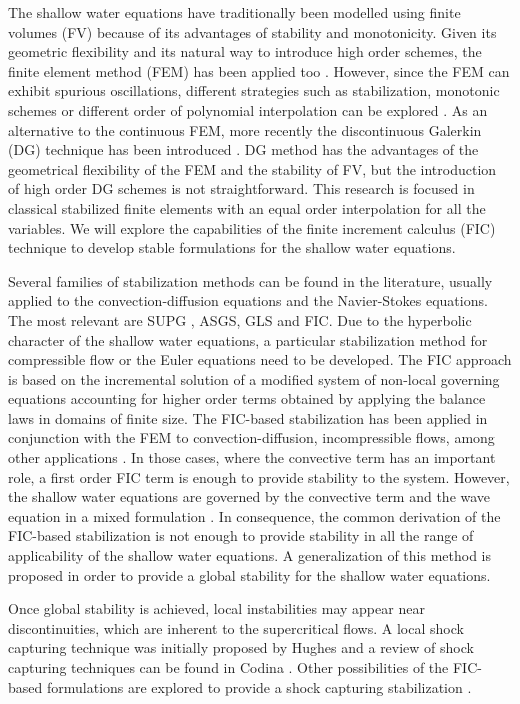 \documentclass[a4paper,12pt]{elsarticle}
\begin{document}
The shallow water equations have traditionally been modelled using finite volumes (FV) because of its advantages of stability and monotonicity. Given its geometric flexibility and its natural way to introduce high order schemes, the finite element method (FEM) has been applied too \cite{zien3,navon1979,navon1988}.
However, since the FEM can exhibit spurious oscillations, different strategies such as stabilization, monotonic schemes or different order of polynomial interpolation can be explored \cite{hood1974,zien3,ortiz2012}.
As an alternative to the continuous FEM, more recently the discontinuous Galerkin (DG) technique has been introduced \cite{ambati2007,khan2014,lee2019}.
DG method has the advantages of the geometrical flexibility of the FEM and the stability of FV, but the introduction of high order DG schemes is not straightforward.
This research is focused in classical stabilized finite elements with an equal order interpolation for all the variables. We will explore the capabilities of the finite increment calculus (FIC) technique to develop stable formulations for the shallow water equations.

Several families of stabilization methods can be found in the literature, usually applied to the convection-diffusion equations and the Navier-Stokes equations. The most relevant are SUPG \cite{brooks1982},
ASGS\cite{codina1998}, GLS \cite{hughes1989} and FIC\cite{onate1996,onate1998}.
Due to the hyperbolic character of the shallow water equations, a particular stabilization method for compressible flow or the Euler equations need to be developed.
The FIC approach is based on the incremental solution of a modified system of non-local governing equations accounting for higher order terms obtained by applying the balance laws in domains of finite size.
The FIC-based stabilization has been applied in conjunction with the FEM to convection-diffusion, incompressible flows, among other applications \cite{onate1998,onate2001}.
In those cases, where the convective term has an important role, a first order FIC term is enough to provide stability to the system.
However, the shallow water equations are governed by the convective term and the wave equation in a mixed formulation \cite{codina2008}. In consequence, the common derivation of the FIC-based stabilization is not enough to provide stability in all the range of applicability of the shallow water equations. 
A generalization of this method is proposed in order to provide a global stability for the shallow water equations.

Once global stability is achieved, local instabilities may appear near discontinuities, which are inherent to the supercritical flows.
A local shock capturing technique was initially proposed by Hughes \cite{hughes1986} and a review of shock capturing techniques can be found in Codina \cite{codina2011}.
Other possibilities of the FIC-based formulations are explored to provide a shock capturing stabilization \cite{cotela2016}.
\end{document}
